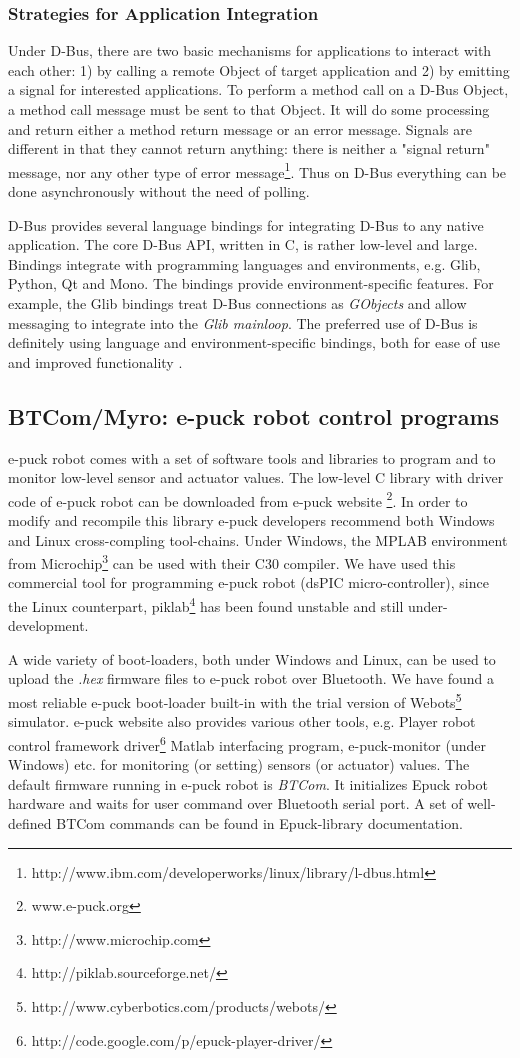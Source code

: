 \subsubsection*{Strategies for Application Integration}
Under D-Bus, there are two basic mechanisms for applications to interact with each other: 1) by calling a remote Object of target application and 2) by emitting a signal for interested applications. To perform a method call on a D-Bus Object, a method call message must be sent to that Object. It will do some processing and return either a method return message or an error message. Signals are different in that they cannot return anything: there is neither a "signal return" message, nor any other type of error message\footnote{http://www.ibm.com/developerworks/linux/library/l-dbus.html}. Thus on D-Bus everything can be done asynchronously without the need of polling.

D-Bus provides several language bindings for integrating D-Bus to any native application. The core D-Bus API, written in C, is rather low-level and large. Bindings integrate with programming languages and environments, e.g. Glib, Python, Qt and Mono. The bindings provide environment-specific features. For example, the Glib bindings treat D-Bus connections as {\em GObjects} and allow messaging to integrate into the {\em Glib mainloop}. The preferred use of D-Bus is definitely using language and environment-specific bindings, both for ease of use and improved functionality \cite{Love2005}.
\subsection{BTCom/Myro: e-puck robot control programs}
\label{expt-tools:btcom}
e-puck robot comes with a set of software tools and libraries to program and to monitor low-level sensor and actuator values. The low-level C library with driver code of e-puck robot can be downloaded from e-puck website \footnote{www.e-puck.org}. In order to modify and recompile this library e-puck developers recommend both Windows and Linux cross-compling tool-chains. Under Windows, the MPLAB environment from Microchip\footnote{http://www.microchip.com} can be used with their C30 compiler. We have used this commercial tool for programming e-puck robot (dsPIC micro-controller), since the Linux counterpart, piklab\footnote{http://piklab.sourceforge.net/} has been found unstable and still under-development. 

A wide variety of boot-loaders, both under Windows and Linux, can be used to upload the {\em .hex} firmware files to e-puck robot over Bluetooth. We have found a most reliable e-puck boot-loader built-in with the trial version of Webots\footnote{http://www.cyberbotics.com/products/webots/} simulator. e-puck website also provides various other tools, e.g. Player robot control framework driver\footnote{http://code.google.com/p/epuck-player-driver/} Matlab interfacing program, e-puck-monitor (under Windows) etc. for monitoring (or setting) sensors (or actuator) values. The default firmware running in e-puck robot is {\em BTCom}. It initializes Epuck robot hardware and waits for user command over Bluetooth serial port. A set of well-defined BTCom commands can be found in Epuck-library documentation. 

